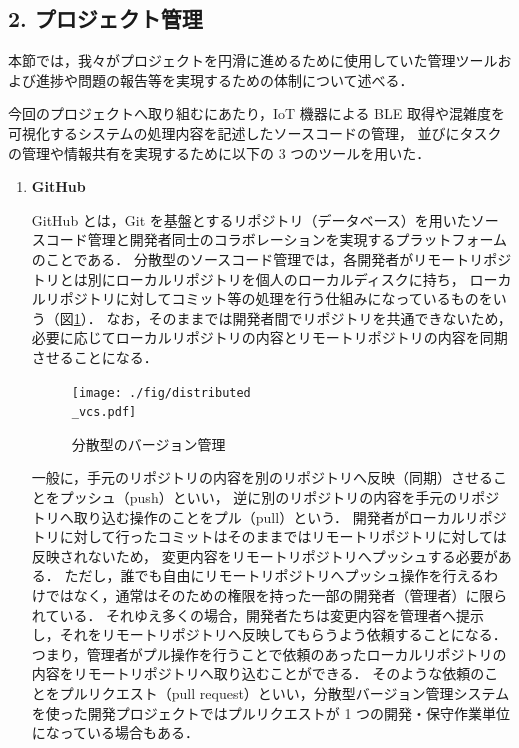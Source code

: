 \subsection*{2. プロジェクト管理}

本節では，我々がプロジェクトを円滑に進めるために使用していた管理ツールおよび進捗や問題の報告等を実現するための体制について述べる．
	
今回のプロジェクトへ取り組むにあたり，IoT 機器による BLE 取得や混雑度を可視化するシステムの処理内容を記述したソースコードの管理，
並びにタスクの管理や情報共有を実現するために以下の 3 つのツールを用いた．
	
\begin{enumerate}
	\item \textbf{GitHub}
	
	GitHub とは，Git\cite{Git} を基盤とするリポジトリ（データベース）を用いたソースコード管理と開発者同士のコラボレーションを実現するプラットフォームのことである\cite{GitHub}．
	分散型のソースコード管理では，各開発者がリモートリポジトリとは別にローカルリポジトリを個人のローカルディスクに持ち，
	ローカルリポジトリに対してコミット等の処理を行う仕組みになっているものをいう（図\ref{fig:分散型のバージョン管理}）．
	なお，そのままでは開発者間でリポジトリを共通できないため，必要に応じてローカルリポジトリの内容とリモートリポジトリの内容を同期させることになる．
	\begin{figure}[tb]
		\centering
		\texttt{[image: ./fig/distributed\\\_vcs.pdf]}
		\caption{分散型のバージョン管理}
		\label{fig:分散型のバージョン管理}
	\end{figure}
	
	一般に，手元のリポジトリの内容を別のリポジトリへ反映（同期）させることをプッシュ（push）といい，
	逆に別のリポジトリの内容を手元のリポジトリへ取り込む操作のことをプル（pull）という．	
	開発者がローカルリポジトリに対して行ったコミットはそのままではリモートリポジトリに対しては反映されないため，
	変更内容をリモートリポジトリへプッシュする必要がある．
	ただし，誰でも自由にリモートリポジトリへプッシュ操作を行えるわけではなく，通常はそのための権限を持った一部の開発者（管理者）に限られている．
	それゆえ多くの場合，開発者たちは変更内容を管理者へ提示し，それをリモートリポジトリへ反映してもらうよう依頼することになる．
	つまり，管理者がプル操作を行うことで依頼のあったローカルリポジトリの内容をリモートリポジトリへ取り込むことができる．
	そのような依頼のことをプルリクエスト（pull request）といい，分散型バージョン管理システムを使った開発プロジェクトではプルリクエストが 1 つの開発・保守作業単位になっている場合もある．
	

\end{enumerate}
